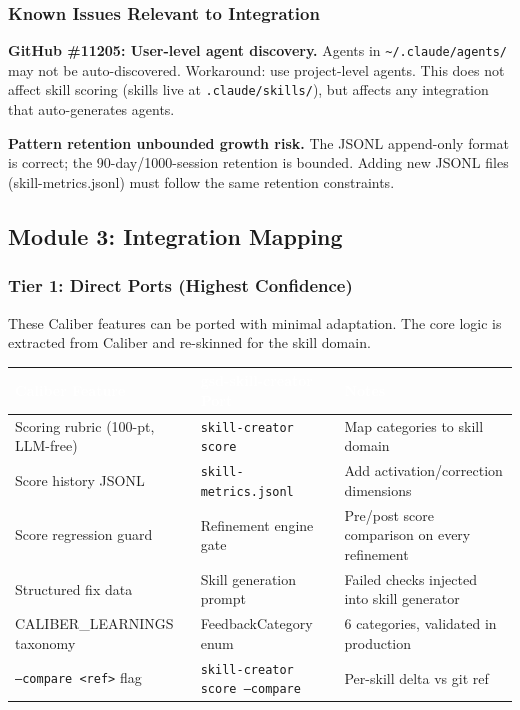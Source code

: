 \documentclass[11pt,letterpaper]{article}
\newcommand{\tableheader}[1]{\textbf{\sffamily\textcolor{white}{#1}}}
\begin{document}
\subsubsection{Known Issues Relevant to Integration}

\textbf{GitHub \#11205: User-level agent discovery.} Agents in \texttt{\textasciitilde{}/.claude/agents/} may not be auto-discovered. Workaround: use project-level agents. This does not affect skill scoring (skills live at \texttt{.claude/skills/}), but affects any integration that auto-generates agents.

\textbf{Pattern retention unbounded growth risk.} The JSONL append-only format is correct; the 90-day/1000-session retention is bounded. Adding new JSONL files (skill-metrics.jsonl) must follow the same retention constraints.

\subsection{Module 3: Integration Mapping}

\subsubsection{Tier 1: Direct Ports (Highest Confidence)}

These Caliber features can be ported with minimal adaptation. The core logic is extracted from Caliber and re-skinned for the skill domain.

\begin{center}
\begin{tabularx}{\textwidth}{L{3cm}L{3.5cm}X}
\toprule
{}
\tableheader{Caliber Feature} & \tableheader{gsd-skill-creator Port} & \tableheader{Notes} \\
\midrule
Scoring rubric (100-pt, LLM-free) & \texttt{skill-creator score} & Map categories to skill domain \\
Score history JSONL & \texttt{skill-metrics.jsonl} & Add activation/correction dimensions \\
Score regression guard & Refinement engine gate & Pre/post score comparison on every refinement \\
Structured fix data & Skill generation prompt & Failed checks injected into skill generator \\
CALIBER\_LEARNINGS taxonomy & FeedbackCategory enum & 6 categories, validated in production \\
\texttt{--compare <ref>} flag & \texttt{skill-creator score --compare} & Per-skill delta vs git ref \\
\bottomrule
\end{tabularx}
\end{center}
\end{document}
